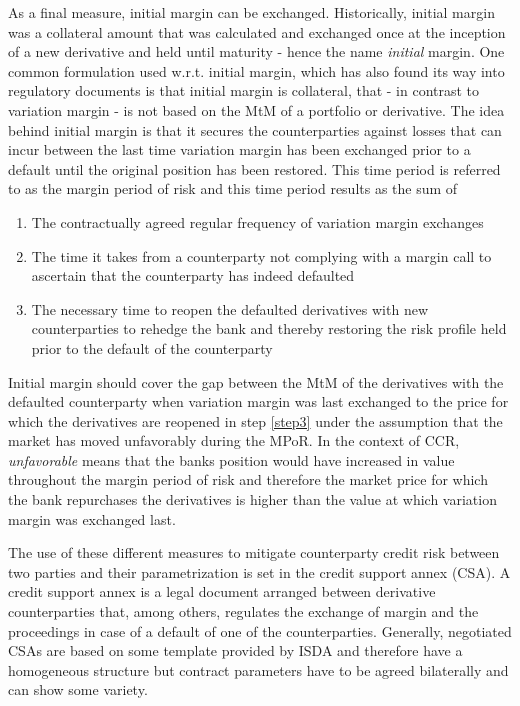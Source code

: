 \documentclass[../Thesis_AHoecherl.tex]{subfiles}
\begin{document}
As a final measure, initial margin can be exchanged. Historically, initial margin was a collateral amount that was calculated and exchanged once at the inception of a new derivative and held until maturity - hence the name \emph{initial} margin. One common formulation used w.r.t. initial margin, which has also found its way into regulatory documents  is that initial margin is collateral, that - in contrast to variation margin - is not based on the \gls{MtM} of a portfolio or derivative. The idea behind initial margin is that it secures the counterparties against losses that can incur between the last time variation margin has been exchanged prior to a default until the original position has been restored. This time period is referred to as the margin period of risk and this time period results as the sum of
\begin{enumerate}
    \item The contractually agreed regular frequency of variation margin exchanges
    \item The time it takes from a counterparty not complying with a margin call to ascertain that the counterparty has indeed defaulted
    \item The necessary time to reopen the defaulted derivatives with new counterparties to rehedge the bank and thereby restoring the risk profile held prior to the default of the counterparty\label{step3}
\end{enumerate}
Initial margin should cover the gap between the \gls{MtM} of the derivatives with the defaulted counterparty when variation margin was last exchanged to the price for which the derivatives are reopened in step \ref{step3} under the assumption that the market has moved unfavorably during the \gls{MPoR}. In the context of CCR, \emph{unfavorable} means that the banks position would have increased in value throughout the margin period of risk and therefore the market price for which the bank repurchases the derivatives is higher than the value at which variation margin was exchanged last.

The use of these different measures to mitigate counterparty credit risk between two parties and their parametrization is set in the credit support annex (\gls{CSA}). 
A credit support annex is a legal document arranged between derivative counterparties that, among others, regulates the exchange of margin and the proceedings in case of a default of one of the counterparties.
Generally, negotiated CSAs are based on some template provided by \gls{ISDA} and therefore have a homogeneous structure but contract parameters have to be agreed bilaterally and can show some variety.
\end{document}
